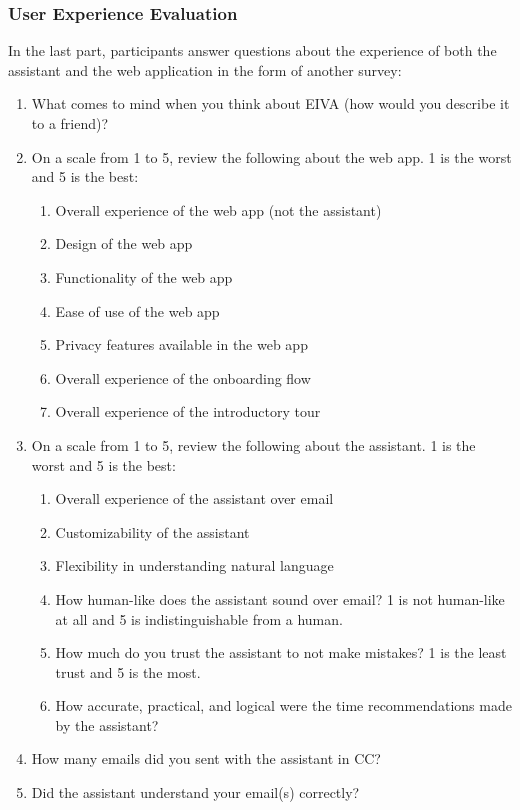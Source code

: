 \documentclass{article}
\begin{document}
\subsubsection{User Experience Evaluation}

In the last part, participants answer questions about the experience of both the assistant and the web application in the form of another survey:

\begin{enumerate}
	\item What comes to mind when you think about EIVA (how would you describe it to a friend)?
	\item On a scale from 1 to 5, review the following about the web app. 1 is the worst and 5 is the best:
	\begin{enumerate}
		\item Overall experience of the web app (not the assistant)
		\item Design of the web app
		\item Functionality of the web app
		\item Ease of use of the web app
		\item Privacy features available in the web app
		\item Overall experience of the onboarding flow
		\item Overall experience of the introductory tour
	\end{enumerate}
	\item On a scale from 1 to 5, review the following about the assistant. 1 is the worst and 5 is the best:
	\begin{enumerate}
		\item Overall experience of the assistant over email
		\item Customizability of the assistant
		\item Flexibility in understanding natural language
		\item How human-like does the assistant sound over email? 1 is not human-like at all and 5 is indistinguishable from a human.
		\item How much do you trust the assistant to not make mistakes? 1 is the least trust and 5 is the most.
		\item How accurate, practical, and logical were the time recommendations made by the assistant?
	\end{enumerate}
	\item How many emails did you sent with the assistant in CC?
	\item Did the assistant understand your email(s) correctly?

\end{enumerate}
\end{document}
